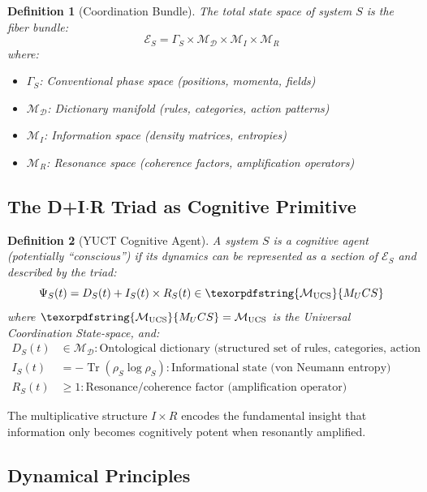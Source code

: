 \documentclass[12pt,a4paper]{article}
\newtheorem{definition}{Definition}
\DeclareMathOperator{\Tr}{Tr}
\DeclareRobustCommand{\UCS}{\texorpdfstring{\ensuremath{\mathcal{M}_{\mathrm{UCS}}}}{M_UCS}}
\newcommand{\Dict}{\mathcal{D}}
\newcommand{\Mdict}{\mathcal{M}_{\Dict}}
\begin{document}
	\begin{definition}[Coordination Bundle]
		The total state space of system \(S\) is the fiber bundle:
		\[
		\mathcal{E}_S = \Gamma_S \times \Mdict \times \mathcal{M}_I \times \mathcal{M}_R
		\]
		where:
		\begin{itemize}
			\item \(\Gamma_S\): Conventional phase space (positions, momenta, fields)
			\item \(\Mdict\): Dictionary manifold (rules, categories, action patterns)
			\item \(\mathcal{M}_I\): Information space (density matrices, entropies)
			\item \(\mathcal{M}_R\): Resonance space (coherence factors, amplification operators)
		\end{itemize}
	\end{definition}
	
	\subsection{The D+I\(\cdot\)R Triad as Cognitive Primitive}
	
	\begin{definition}[YUCT Cognitive Agent]
		A system \(S\) is a cognitive agent (potentially ``conscious'') if its dynamics can be represented as a section of \(\mathcal{E}_S\) and described by the triad:
		\begin{equation}
			\label{eq:dir-triad}
			\Psi_S(t) = D_S(t) + I_S(t) \times R_S(t) \in \UCS
		\end{equation}
		where \(\UCS = \mathcal{M}_{\mathrm{UCS}}\) is the Universal Coordination State-space, and:
		\begin{align*}
			D_S(t) &\in \Mdict: \text{Ontological dictionary (structured set of rules, categories, action patterns)} \\
			I_S(t) &= -\Tr(\rho_S \log \rho_S): \text{Informational state (von Neumann entropy)} \\
			R_S(t) &\geq 1: \text{Resonance/coherence factor (amplification operator)}
		\end{align*}
	\end{definition}
	
	The multiplicative structure \(I \times R\) encodes the fundamental insight that information only becomes cognitively potent when resonantly amplified.
	
	\subsection{Dynamical Principles}
	
\end{document}
